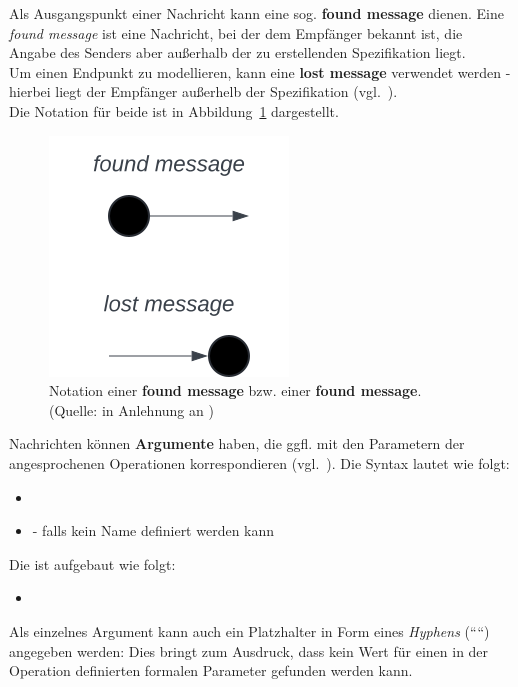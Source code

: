 \noindent
Als Ausgangspunkt einer Nachricht kann eine sog. \textbf{found message} dienen. Eine \textit{found message} ist eine Nachricht, bei der dem Empfänger bekannt ist, die Angabe des Senders aber außerhalb der zu erstellenden Spezifikation liegt.\\
Um einen Endpunkt zu modellieren, kann eine \textbf{lost message} verwendet werden - hierbei liegt der Empfänger außerhelb der Spezifikation  (vgl.~\cite[598]{OMG17}).\\
Die Notation für beide ist in Abbildung~\ref{fig:lost-found-message} dargestellt.

\begin{figure}
    \centering
    \includegraphics[scale=0.5]{part three/Sequenzdiagramme/img/lost-found-message}
    \caption{Notation einer \textbf{found message} bzw. einer \textbf{found message}. (Quelle: in Anlehnung an \cite[596]{OMG17})}
    \label{fig:lost-found-message}
\end{figure}

\noindent
Nachrichten können \textbf{Argumente} haben, die ggfl. mit den Parametern der angesprochenen Operationen korrespondieren (vgl.~\cite[32]{Buh09}).
Die Syntax lautet wie folgt:

\begin{itemize}
    \item {}
    \item \code{*} - falls kein Name definiert werden kann
\end{itemize}

\noindent
Die  ist aufgebaut wie folgt:

\begin{itemize}
    \item {}
\end{itemize}

\noindent
Als einzelnes Argument kann auch ein Platzhalter in Form eines \textit{Hyphens} (``\code{-}``) angegeben werden: Dies bringt zum Ausdruck, dass kein Wert für einen in der Operation definierten formalen Parameter gefunden werden kann.\\


